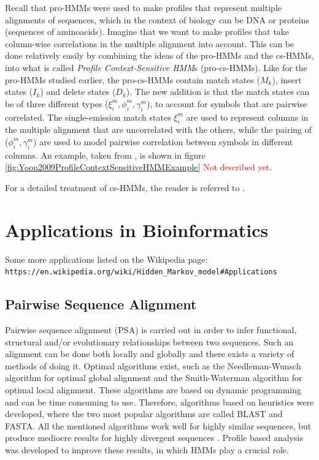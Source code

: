 \documentclass{article}\usepackage[]{graphicx}\usepackage[]{color}
\begin{document}
Recall that pro-HMMs were used to make profiles that represent multiple alignments of sequences, which in the context of biology can be DNA or proteins (sequences of aminoacids). Imagine that we want to make profiles that take column-wise correlations in the multiple alignment into account. This can be done relatively easily by combining the ideas of the pro-HMMs and the cs-HMMs, into what is called \textit{Profile Context-Sensitive HMM}s (pro-cs-HMMs). Like for the pro-HMMs studied earlier, the pro-cs-HMMs contain match states ($M_k$), insert states ($I_k$) and delete states ($D_k$). The new addition is that the match states can be of three different types ($\xi_i^m, \phi_i^m, \gamma_i^m$), to account for symbols that are pairwise correlated. The single-emission match states $\xi_i^m$ are used to represent columns in the multiple alignment that are uncorrelated with the others, while the pairing of ($\phi_i^m, \gamma_i^m$) are used to model pairwise correlation between symbols in different columns. An example, taken from \cite{Yoon2009}, is shown in figure \ref{fig:Yoon2009ProfileContextSensitiveHMMExample} \textcolor{red}{Not described yet}.

For a detailed treatment of cs-HMMs, the reader is referred to \cite{Yoon2006}.

\section{Applications in Bioinformatics}
Some more applications listed on the Wikipedia page: \verb$https://en.wikipedia.org/wiki/Hidden_Markov_model#Applications$

\subsection{Pairwise Sequence Alignment}\label{Section:PairwiseSequenceAlignment}
Pairwise sequence alignment (PSA) is carried out in order to infer functional, structural and/or evolutionary relationships between two sequences. Such an alignment can be done both locally and globally and there exists a variety of methods of doing it. Optimal algorithms exist, such as the Needleman-Wunsch algorithm for optimal global alignment and the Smith-Waterman algorithm for optimal local alignment. These algorithms are based on dynamic programming and can be time consuming to use. Therefore, algorithms based on heuristics were developed, where the two most popular algorithms are called BLAST and FASTA. All the mentioned algorithms work well for highly similar sequences, but produce mediocre results for highly divergent sequences \cite{Choo2004}. Profile based analysis was developed to improve these results, in which HMMs play a crucial role. 
\end{document}
